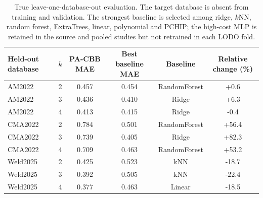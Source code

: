 \begin{table}[t]
\caption{True leave-one-database-out evaluation. The target database is absent from training and validation. The strongest baseline is selected among ridge, $k$NN, random forest, ExtraTrees, linear, polynomial and PCHIP; the high-cost MLP is retained in the source and pooled studies but not retrained in each LODO fold.}
\label{tab:lodo}
\centering\scriptsize
\begin{tabular}{lccccc}
\toprule
Held-out database & $k$ & PA-CBB MAE & Best baseline MAE & Baseline & Relative change (\%) \\
\midrule
AM2022 & 2 & 0.457 & 0.454 & RandomForest & +0.6 \\
AM2022 & 3 & 0.436 & 0.410 & Ridge & +6.3 \\
AM2022 & 4 & 0.413 & 0.415 & Ridge & -0.4 \\
CMA2022 & 2 & 0.784 & 0.501 & RandomForest & +56.4 \\
CMA2022 & 3 & 0.739 & 0.405 & Ridge & +82.3 \\
CMA2022 & 4 & 0.709 & 0.463 & RandomForest & +53.2 \\
Weld2025 & 2 & 0.425 & 0.523 & kNN & -18.7 \\
Weld2025 & 3 & 0.392 & 0.505 & kNN & -22.4 \\
Weld2025 & 4 & 0.377 & 0.463 & Linear & -18.5 \\
\bottomrule
\end{tabular}
\end{table}